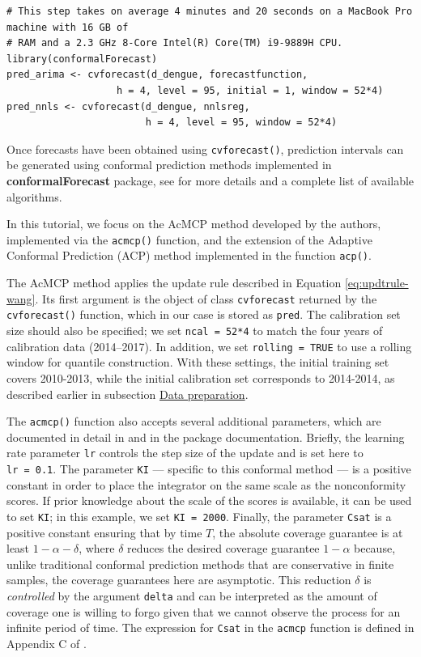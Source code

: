 \begin{verbatim}
# This step takes on average 4 minutes and 20 seconds on a MacBook Pro machine with 16 GB of 
# RAM and a 2.3 GHz 8-Core Intel(R) Core(TM) i9-9889H CPU.
library(conformalForecast)
pred_arima <- cvforecast(d_dengue, forecastfunction,
                   h = 4, level = 95, initial = 1, window = 52*4)
pred_nnls <- cvforecast(d_dengue, nnlsreg, 
                        h = 4, level = 95, window = 52*4)
\end{verbatim}

Once forecasts have been obtained using \texttt{cvforecast()}, prediction
intervals can be generated using conformal prediction methods
implemented in \textbf{conformalForecast} package, see \citet{Wang_Hyndman_2024} for
more details and a complete list of available algorithms.

In this tutorial, we focus on the AcMCP method developed by the authors,
implemented via the \texttt{acmcp()} function, and the extension of the Adaptive Conformal Prediction (ACP) method implemented in the function \texttt{acp()}.

The AcMCP method applies the update rule described in Equation \eqref{eq:updtrule-wang}. Its first argument
is the object of class \texttt{cvforecast} returned by the \texttt{cvforecast()}
function, which in our case is stored as \texttt{pred}. The calibration set
size should also be specified; we set \texttt{ncal\ =\ 52*4} to match the four
years of calibration data (2014--2017). In addition, we set
\texttt{rolling\ =\ TRUE} to use a rolling window for quantile construction. With
these settings, the initial training set covers 2010-2013, while the
initial calibration set corresponds to 2014-2014, as described earlier
in subsection \hyperref[data-prep-section]{Data preparation}.

The \texttt{acmcp()} function also accepts several additional parameters, which
are documented in detail in \citet{Wang_Hyndman_2024} and in the package
documentation. Briefly, the learning rate parameter \texttt{lr} controls the
step size of the update and is set here to \texttt{lr\ =\ 0.1}. The parameter
\texttt{KI} --- specific to this conformal method --- is a positive constant in
order to place the integrator on the same scale as the nonconformity
scores. If prior knowledge about the scale of the scores is available,
it can be used to set \texttt{KI}; in this example, we set \texttt{KI\ =\ 2000}.
Finally, the parameter \texttt{Csat} is a positive constant ensuring that by
time \(T\), the absolute coverage guarantee is at least \(1-\alpha-\delta\),
where \(\delta\) reduces the desired coverage guarantee \(1-\alpha\)
because, unlike traditional conformal prediction methods that are
conservative in finite samples, the coverage guarantees here are
asymptotic. This reduction \(\delta\) is \emph{controlled} by the argument
\texttt{delta} and can be interpreted as the amount of coverage one is willing
to forgo given that we cannot observe the process for an infinite
period of time. The expression for \texttt{Csat} in the \texttt{acmcp} function is
defined in Appendix C of \citet{angelopoulos2023}.

